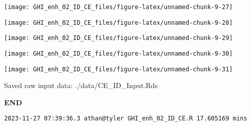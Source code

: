 \documentclass[
  10pt,
  a4paper,oneside]{article}
\begin{document}
\begin{center}\texttt{[image: GHI\_enh\_02\_ID\_CE\_files/figure-latex/unnamed-chunk-9-27]} \end{center}

\begin{center}\texttt{[image: GHI\_enh\_02\_ID\_CE\_files/figure-latex/unnamed-chunk-9-28]} \end{center}

\begin{center}\texttt{[image: GHI\_enh\_02\_ID\_CE\_files/figure-latex/unnamed-chunk-9-29]} \end{center}

\begin{center}\texttt{[image: GHI\_enh\_02\_ID\_CE\_files/figure-latex/unnamed-chunk-9-30]} \end{center}

\begin{center}\texttt{[image: GHI\_enh\_02\_ID\_CE\_files/figure-latex/unnamed-chunk-9-31]} \end{center}

Saved raw input data: ./data/CE\_ID\_Input.Rds

\textbf{END}

\begin{verbatim}
2023-11-27 07:39:36.3 athan@tyler GHI_enh_02_ID_CE.R 17.605169 mins
\end{verbatim}
\end{document}
